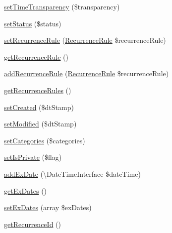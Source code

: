 \begin{DoxyCompactItemize}
\mbox{\hyperlink{class_eluceo_1_1i_cal_1_1_component_1_1_event_a7387669529b87eb196b4aae53e3b2782}{set\+Time\+Transparency}} (\$transparency)
\item 
\mbox{\hyperlink{class_eluceo_1_1i_cal_1_1_component_1_1_event_a52ea8343945673a010bd114d50399702}{set\+Status}} (\$status)
\item 
\mbox{\hyperlink{class_eluceo_1_1i_cal_1_1_component_1_1_event_a8301adc5310ee5a3281f40599607c86d}{set\+Recurrence\+Rule}} (\mbox{\hyperlink{class_eluceo_1_1i_cal_1_1_property_1_1_event_1_1_recurrence_rule}{Recurrence\+Rule}} \$recurrence\+Rule)
\item 
\mbox{\hyperlink{class_eluceo_1_1i_cal_1_1_component_1_1_event_a4414331a51599c2dd5432eba86008518}{get\+Recurrence\+Rule}} ()
\item 
\mbox{\hyperlink{class_eluceo_1_1i_cal_1_1_component_1_1_event_a204c48aab126855e3176ed4a796361be}{add\+Recurrence\+Rule}} (\mbox{\hyperlink{class_eluceo_1_1i_cal_1_1_property_1_1_event_1_1_recurrence_rule}{Recurrence\+Rule}} \$recurrence\+Rule)
\item 
\mbox{\hyperlink{class_eluceo_1_1i_cal_1_1_component_1_1_event_ae16e025ea3945376ce6a73084989d998}{get\+Recurrence\+Rules}} ()
\item 
\mbox{\hyperlink{class_eluceo_1_1i_cal_1_1_component_1_1_event_a8a9ac44bf639ae275bebae3ad22eb238}{set\+Created}} (\$dt\+Stamp)
\item 
\mbox{\hyperlink{class_eluceo_1_1i_cal_1_1_component_1_1_event_aaebe7c920032e1ea1025db235c9d2003}{set\+Modified}} (\$dt\+Stamp)
\item 
\mbox{\hyperlink{class_eluceo_1_1i_cal_1_1_component_1_1_event_ab8e1826d0bbfa8741667e0c9c06ac186}{set\+Categories}} (\$categories)
\item 
\mbox{\hyperlink{class_eluceo_1_1i_cal_1_1_component_1_1_event_a4fb6334dcfa12640cd0a5e0014f30073}{set\+Is\+Private}} (\$flag)
\item 
\mbox{\hyperlink{class_eluceo_1_1i_cal_1_1_component_1_1_event_af5aeaa2d4977aff633e5d3d7b69e49e4}{add\+Ex\+Date}} (\textbackslash{}Date\+Time\+Interface \$date\+Time)
\item 
\mbox{\hyperlink{class_eluceo_1_1i_cal_1_1_component_1_1_event_a2809ef50254d73bbba21837f56dcad32}{get\+Ex\+Dates}} ()
\item 
\mbox{\hyperlink{class_eluceo_1_1i_cal_1_1_component_1_1_event_a7a5e86f13809c946c761268c804f139a}{set\+Ex\+Dates}} (array \$ex\+Dates)
\item 
\mbox{\hyperlink{class_eluceo_1_1i_cal_1_1_component_1_1_event_aa76dff4b92d0a324f6c553ec08b50451}{get\+Recurrence\+Id}} ()

\end{DoxyCompactItemize}
